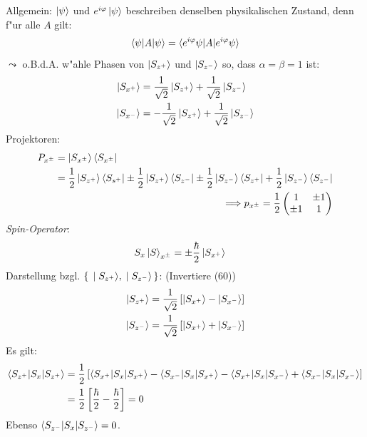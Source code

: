 \documentclass[a4paper]{scrartcl}
\newenvironment{aaufz}
	{\renewcommand{\labelenumi}{\alph{enumi})}
   \renewcommand{\labelenumii}{\alph{enumii})}
   \begin{enumerate}}
  {\end{enumerate}}
\renewcommand{\phi}{\ensuremath \varphi}
\begin{document}
{\begin{aaufz}
Allgemein: $\ket \psi$ und $e ^{i \phi} \ket \psi$ beschreiben denselben physikalischen Zustand, denn f"ur alle $A$ gilt:
$$\braket{ \psi | A  | \psi} = \braket{ e^{i \phi} \psi | A | e^{i \phi} \psi }$$
$\leadsto$ o.B.d.A. w"ahle Phasen von $\ket {S_{z^+}}$ und $\ket{ S_{z^-}}$ so, dass $\alpha = \beta = 1$ ist:
\begin{align}
\begin{split}
\ket{ S_{x^+}} & = \frac1{\sqrt2} \ket{S_{z^+}} + \frac1{\sqrt2} \ket{S_{z^-}} \\
\ket{ S_{x^-}} & = -\frac1{\sqrt2} \ket{ S_{z^+}} + \frac1{\sqrt2} \ket{S_{z^-}}
\end{split}
\end{align}
Projektoren:
\begin{align}
\begin{split}
P_{x^\pm} & = \ket{S_{x^\pm}} \bra{S_{x^\pm}} \\
& = \frac12  \ket{ S_{z^+} } \bra{S_{s^+}} \pm \frac 12 \ket {S_{z^+}} \bra{ S_{z^-}} \pm \frac12 \ket{S_{z^-}} \bra{S_{z^+}} + \frac12 \ket{S_{z^-}} \bra{S_{z^-}} 
\end{split} \\
\Longrightarrow p_{x^\pm} = \frac12\begin{pmatrix} 1 & \pm1 \\ \pm 1 & 1 \end{pmatrix}
\end{align}
\emph{Spin-Operator}:
\begin{align} S_x \ket S_{x^\pm} & = \pm \frac \hbar 2 \ket{S_{x^+}} \end{align}
Darstellung bzgl. $\set{ \ket{ S_{z^+}}, \ket{ S_{z^-}}}$: (Invertiere (60))
\begin{align}
\begin{split}
\ket{ S_{z^+}} & = \frac1 {\sqrt2} \left[ \ket{ S_{x^+} }- \ket{ S_{x^-}} \right] \\
\ket{ S_{z^-}} & = \frac1 {\sqrt2} \left[ \ket{ S_{x^+} }+ \ket{ S_{x^-}} \right] 
\end{split}
\end{align}
Es gilt:
\begin{align*}
\braket{ S_{z^+} | S_x | S_{z^+}} & = \frac12 \left[ \braket{S_{x^+} | S_x | S_{x^+} } - \braket{ S_{x^-} | S_x | S_{x^+}} - \braket{ S_{x^+} | S_x | S_{x^-}} + \braket{ S_{x^-} | S_x | S_{x^-}} \right]  \\ 
& = \frac12 \left[ \frac \hbar 2 - \frac \hbar 2 \right] = 0
\end{align*}
Ebenso $\braket{ S_{z^-} | S_x | S_{z^-} } = 0$.


\end{aaufz}}
\end{document}
